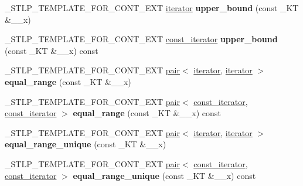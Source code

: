 \begin{DoxyCompactItemize}
\+\_\+\+S\+T\+L\+P\+\_\+\+T\+E\+M\+P\+L\+A\+T\+E\+\_\+\+F\+O\+R\+\_\+\+C\+O\+N\+T\+\_\+\+E\+XT \hyperlink{struct___rb__tree__iterator}{iterator} {\bfseries upper\+\_\+bound} (const \+\_\+\+KT \&\+\_\+\+\_\+x)
\item 
\mbox{\label{class___rb__tree_a21064bcd2d2c007a4387159073ce3d73}} 
\+\_\+\+S\+T\+L\+P\+\_\+\+T\+E\+M\+P\+L\+A\+T\+E\+\_\+\+F\+O\+R\+\_\+\+C\+O\+N\+T\+\_\+\+E\+XT \hyperlink{struct___rb__tree__iterator}{const\+\_\+iterator} {\bfseries upper\+\_\+bound} (const \+\_\+\+KT \&\+\_\+\+\_\+x) const
\item 
\mbox{\label{class___rb__tree_a3fe62161edfd2ac095d1c825b6bcf42a}} 
\+\_\+\+S\+T\+L\+P\+\_\+\+T\+E\+M\+P\+L\+A\+T\+E\+\_\+\+F\+O\+R\+\_\+\+C\+O\+N\+T\+\_\+\+E\+XT \hyperlink{structpair}{pair}$<$ \hyperlink{struct___rb__tree__iterator}{iterator}, \hyperlink{struct___rb__tree__iterator}{iterator} $>$ {\bfseries equal\+\_\+range} (const \+\_\+\+KT \&\+\_\+\+\_\+x)
\item 
\mbox{\label{class___rb__tree_a0195db7b12403526c29a41407d898cf7}} 
\+\_\+\+S\+T\+L\+P\+\_\+\+T\+E\+M\+P\+L\+A\+T\+E\+\_\+\+F\+O\+R\+\_\+\+C\+O\+N\+T\+\_\+\+E\+XT \hyperlink{structpair}{pair}$<$ \hyperlink{struct___rb__tree__iterator}{const\+\_\+iterator}, \hyperlink{struct___rb__tree__iterator}{const\+\_\+iterator} $>$ {\bfseries equal\+\_\+range} (const \+\_\+\+KT \&\+\_\+\+\_\+x) const
\item 
\mbox{\label{class___rb__tree_a8c21e26a576b361e54e9f82ef967f48e}} 
\+\_\+\+S\+T\+L\+P\+\_\+\+T\+E\+M\+P\+L\+A\+T\+E\+\_\+\+F\+O\+R\+\_\+\+C\+O\+N\+T\+\_\+\+E\+XT \hyperlink{structpair}{pair}$<$ \hyperlink{struct___rb__tree__iterator}{iterator}, \hyperlink{struct___rb__tree__iterator}{iterator} $>$ {\bfseries equal\+\_\+range\+\_\+unique} (const \+\_\+\+KT \&\+\_\+\+\_\+x)
\item 
\mbox{\label{class___rb__tree_a31ce190bfc0d827852c917f9e220b45f}} 
\+\_\+\+S\+T\+L\+P\+\_\+\+T\+E\+M\+P\+L\+A\+T\+E\+\_\+\+F\+O\+R\+\_\+\+C\+O\+N\+T\+\_\+\+E\+XT \hyperlink{structpair}{pair}$<$ \hyperlink{struct___rb__tree__iterator}{const\+\_\+iterator}, \hyperlink{struct___rb__tree__iterator}{const\+\_\+iterator} $>$ {\bfseries equal\+\_\+range\+\_\+unique} (const \+\_\+\+KT \&\+\_\+\+\_\+x) const
\item 

\end{DoxyCompactItemize}
